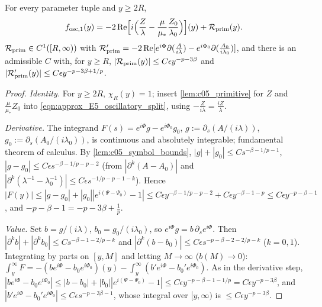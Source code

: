 \begin{lemma}
  \label{lem:c05_fundamental_primitive}
  For every parameter tuple and $y\ge2R$,
  \begin{equation}\label{eqn:approx_E5_fundamental_primitive}
    f_{\textup{osc},1}(y)=-2\operatorname{Re}\Bigl[i\Bigl(\frac{Z}{\lambda}-\frac{\mu}{\mu_*}\frac{Z_0}{\lambda_0}\Bigr)\Bigr](y)+\mathcal{R}_{\textup{prim}}(y).
  \end{equation}
  $\mathcal{R}_{\textup{prim}}\in C^1([R,\infty))$ with
  $\mathcal{R}_{\textup{prim}}'=-2\operatorname{Re}[e^{i\Phi}\partial(\frac{A}{i\lambda})-e^{i\Phi_0}\partial(\frac{A_0}{i\lambda_0})]$, and there is an
  admissible $C$ with, for $y\ge R$,
  $|\mathcal{R}_{\textup{prim}}(y)|\le C\epsilon y^{-p-3\beta}$ and $|\mathcal{R}_{\textup{prim}}'(y)|\le C\epsilon y^{-p-3\beta+1/p}$.
\end{lemma}
\begin{proof}
  \emph{Identity.} For $y\ge2R$, $\chi_R(y)=1$; insert \cref{lem:c05_primitive} for $Z$ and $\frac{\mu}{\mu_*}Z_0$ into
  \eqref{eqn:approx_E5_oscillatory_split}, using $-\frac{Z}{i\lambda}=\frac{iZ}{\lambda}$.

  \emph{Derivative.} The integrand $F(s)=e^{i\Phi}g-e^{i\Phi_0}g_0$, $g:=\partial_s(A/(i\lambda))$, $g_0:=\partial_s(A_0/(i\lambda_0))$, is
  continuous and absolutely integrable; fundamental theorem of calculus. By \cref{lem:c05_symbol_bounds},
  $|g|+|g_0|\le Cs^{-\beta-1/p-1}$, $|g-g_0|\le C\epsilon s^{-\beta-1/p-p-2}$ (from $|\partial^k(A-A_0)|$ and
  $|\partial^k(\lambda^{-1}-\lambda_0^{-1})|\le C\epsilon s^{-1/p-p-1-k}$). Hence
  $|F(y)|\le|g-g_0|+|g_0||e^{i(\Psi-\Psi_0)}-1|\le C\epsilon y^{-\beta-1/p-p-2}+C\epsilon y^{-\beta-1-p}\le C\epsilon y^{-p-\beta-1}$,
  and $-p-\beta-1=-p-3\beta+\frac1p$.

  \emph{Value.} Set $b=g/(i\lambda)$, $b_0=g_0/(i\lambda_0)$, so $e^{i\Phi}g=b\,\partial_se^{i\Phi}$. Then
  $|\partial^kb|+|\partial^kb_0|\le Cs^{-\beta-1-2/p-k}$ and $|\partial^k(b-b_0)|\le C\epsilon s^{-p-\beta-2-2/p-k}$ ($k=0,1$).
  Integrating by parts on $[y,M]$ and letting $M\to\infty$ ($b(M)\to0$):
  $\int_y^\infty F=-(be^{i\Phi}-b_0e^{i\Phi_0})(y)-\int_y^\infty(b'e^{i\Phi}-b_0'e^{i\Phi_0})$. As in the derivative step,
  $|be^{i\Phi}-b_0e^{i\Phi_0}|\le|b-b_0|+|b_0||e^{i(\Psi-\Psi_0)}-1|\le C\epsilon y^{-p-\beta-1-1/p}=C\epsilon y^{-p-3\beta}$, and
  $|b'e^{i\Phi}-b_0'e^{i\Phi_0}|\le C\epsilon s^{-p-3\beta-1}$, whose integral over $[y,\infty)$ is $\le C\epsilon y^{-p-3\beta}$.
\end{proof}

